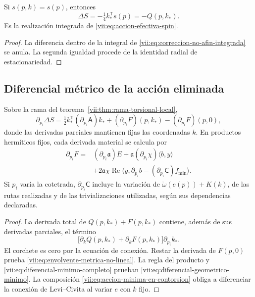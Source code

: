 \begin{corollary}
\label{vii:cor:recuperacion-eliminacion-afin}
Si \(s(p,k)=s(p)\), entonces
\[
 \Delta S=-\tfrac14 k_*^{\mathsf T}s(p)=-Q(p,k_*).
\]
Es la realización integrada de
\eqref{vii:eq:accion-efectiva-spin}.
\end{corollary}
\begin{proof}
La diferencia dentro de la integral de
\eqref{vii:eq:correccion-no-afin-integrada} se anula. La segunda
igualdad procede de la identidad radial de estacionariedad.
\end{proof}

\subsection{Diferencial métrico de la acción eliminada}
\label{vii:subsec:diferencial-metrico-no-lineal}

\begin{theorem}
\label{vii:thm:envolvente-metrica}
Sobre la rama del teorema~\ref{vii:thm:rama-torsional-local},
\begin{equation}
 \partial_{p_i}\Delta S
 =\tfrac12 k_*^{\mathsf T}(\partial_{p_i}\mathsf A)k_*
  +(\partial_{p_i}F)(p,k_*)-(\partial_{p_i}F)(p,0),
 \label{vii:eq:envolvente-metrica-no-lineal}
\end{equation}
donde las derivadas parciales mantienen fijas las coordenadas \(k\).
En productos hermíticos fijos, cada derivada material se calcula por
\begin{equation}
 \begin{split}
 \partial_{p_i}F={}&(\partial_{p_i}\mathfrak a)E
       +\mathfrak a(\partial_{p_i}\chi)\langle b,y\rangle\\
   &+2\mathfrak a\chi\operatorname{Re}
       \langle y,\partial_{p_i}b
                    -(\partial_{p_i}\mathsf C)f_{\min}\rangle.
 \end{split}
 \label{vii:eq:diferencial-geometrico-minimo}
\end{equation}
Si \(p_i\) varía la cotetrada, \(\partial_{p_i}\mathsf C\)
incluye la variación de
\(\mathring\omega(e(p))+K(k)\), de las rutas realizadas y de
las trivializaciones utilizadas, según sus dependencias declaradas.
\end{theorem}

\begin{proof}
La derivada total de \(Q(p,k_*)+F(p,k_*)\) contiene, además
de sus derivadas parciales, el término
\[
 \bigl[\partial_kQ(p,k_*)+\partial_kF(p,k_*)\bigr]
                      \partial_{p_i}k_*.
\]
El corchete es cero por la ecuación de conexión. Restar la derivada
de \(F(p,0)\) prueba
\eqref{vii:eq:envolvente-metrica-no-lineal}.
La regla del producto y
\eqref{vii:eq:diferencial-minimo-completo} prueban
\eqref{vii:eq:diferencial-geometrico-minimo}. La composición
\eqref{vii:eq:accion-minima-en-contorsion} obliga a diferenciar
la conexión de Levi--Civita al variar \(e\) con \(k\) fijo.
\end{proof}

